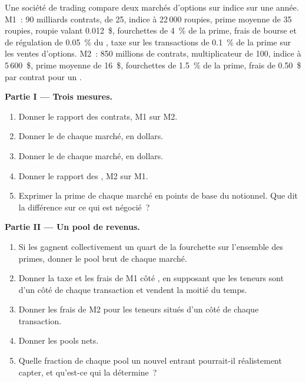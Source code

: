 \begin{problem}\label{pb:m1:options-markets-europe-asia:1}
Une société de trading compare deux marchés d'options sur indice sur une année. M1~: 90 milliards
contrats,  de 25, indice à 22\,000 roupies, prime moyenne de 35 roupies, roupie
valant 0.012~\$, fourchettes de 4~\% de la prime, frais de bourse et de régulation de 0.05~\% du
, taxe sur les transactions de 0.1~\% de la prime sur les ventes d'options. M2~: 850
millions de contrats, multiplicateur de 100, indice à 5\,600~\$, prime moyenne de 16~\$,
fourchettes de 1.5~\% de la prime, frais de 0.50~\$ par contrat pour un .

\medskip\noindent\textbf{Partie I --- Trois mesures.}
\begin{enumerate}
\item Donner le rapport des contrats, M1 sur M2.
\item Donner le  de chaque marché, en dollars.
\item Donner le  de chaque marché, en dollars.
\item Donner le rapport des , M2 sur M1.
\item Exprimer la prime de chaque marché en points de base du notionnel. Que dit
la différence sur ce qui est négocié~?
\end{enumerate}

\medskip\noindent\textbf{Partie II --- Un pool de revenus.}
\begin{enumerate}[resume]
\item Si les  gagnent collectivement un quart de la fourchette
sur l'ensemble des primes, donner le pool brut de chaque marché.
\item Donner la taxe et les frais de M1 côté , en supposant que
les teneurs sont d'un côté de chaque transaction et vendent la moitié du temps.
\item Donner les frais de M2 pour les teneurs situés d'un côté de chaque transaction.
\item Donner les pools nets.
\item Quelle fraction de chaque pool un nouvel entrant pourrait-il réalistement
capter, et qu'est-ce qui la détermine~?
\end{enumerate}


\end{problem}
